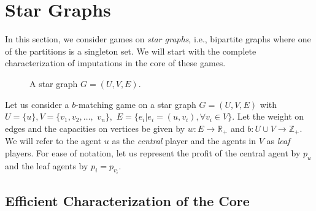 
\section{Star Graphs}

In this section, we consider games on \textit{star graphs}, i.e., bipartite graphs where one of the partitions is a singleton set. We will start with the complete characterization of imputations in the core of these games.\\
\begin{figure}[H]
    \centering
    \caption{A star graph $G=(U,V,E)$.}
    \label{fig:general_stars}
\end{figure}
Let us consider a $b$-matching game on a star graph $G=(U,V,E)$ with $U=\{u\}, V=\{v_1,v_2,\ldots, $ $v_n\},$ $E = \{e_i| e_i=(u,v_i), \forall v_i\in V\}$. Let the weight on edges and the capacities on vertices be given by $w:E\rightarrow \mathbb{R}_+$ and $b:U\cup V \rightarrow \mathbb{Z}_+$. We will refer to the agent $u$ as the \textit{central} player and the agents in $V$ as \textit{leaf} players. For ease of notation, let us represent the profit of the central agent by $p_u$ and the leaf agents by $p_i = p_{v_i}$. 


\subsection{Efficient Characterization of the Core}

